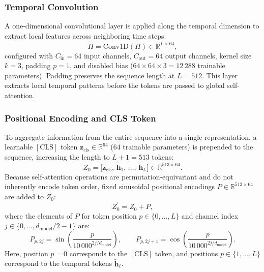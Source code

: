 \documentclass[a4paper,fleqn]{cas-sc}
\begin{document}
\subsubsection{Temporal Convolution}

A one-dimensional convolutional layer is applied along the temporal dimension to extract local features across neighboring time steps:
\begin{equation}
\widetilde{H} = \mathrm{Conv1D}(H) \in \mathbb{R}^{L \times 64},
\label{eq:conv1d}
\end{equation}
configured with $C_{\mathrm{in}} = 64$ input channels, $C_{\mathrm{out}} = 64$ output channels, kernel size $k = 3$, padding $p = 1$, and disabled bias ($64 \times 64 \times 3 = 12\,288$ trainable parameters). Padding preserves the sequence length at $L = 512$. This layer extracts local temporal patterns before the tokens are passed to global self-attention.

\subsubsection{Positional Encoding and CLS Token}

To aggregate information from the entire sequence into a single representation, a learnable $\mathrm{[CLS]}$ token $\mathbf{z}_{\mathrm{cls}} \in \mathbb{R}^{64}$ ($64$ trainable parameters) is prepended to the sequence, increasing the length to $L + 1 = 513$ tokens:
\begin{equation}
Z_0 = \bigl[\mathbf{z}_{\mathrm{cls}},\, \widetilde{\mathbf{h}}_1,\, \dots,\, \widetilde{\mathbf{h}}_L\bigr] \in \mathbb{R}^{513 \times 64}.
\label{eq:cls_prepend}
\end{equation}
Because self-attention operations are permutation-equivariant and do not inherently encode token order, fixed sinusoidal positional encodings $P \in \mathbb{R}^{513 \times 64}$ are added to $Z_0$:
\begin{equation}
Z_0^{\prime} = Z_0 + P,
\label{eq:pos_enc}
\end{equation}
where the elements of $P$ for token position $p \in \{0, \dots, L\}$ and channel index $j \in \{0, \dots, d_{\mathrm{model}}/2 - 1\}$ are:
\begin{equation}
P_{p, 2j} = \sin\!\left(\frac{p}{10\,000^{2j/d_{\mathrm{model}}}}\right), \qquad P_{p, 2j+1} = \cos\!\left(\frac{p}{10\,000^{2j/d_{\mathrm{model}}}}\right).
\label{eq:sinusoidal}
\end{equation}
Here, position $p = 0$ corresponds to the $\mathrm{[CLS]}$ token, and positions $p \in \{1, \dots, L\}$ correspond to the temporal tokens $\widetilde{\mathbf{h}}_\ell$.
\end{document}

